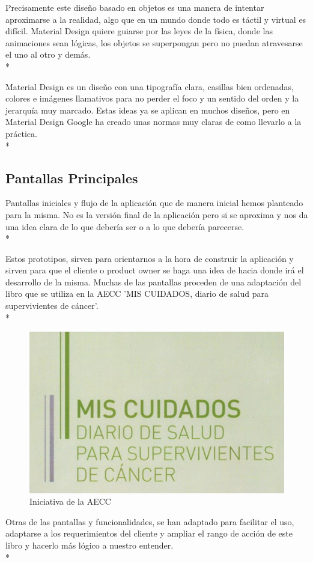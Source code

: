 \documentclass[../pfc.tex]{subfiles}
\begin{document}
		Precisamente este diseño basado en objetos es una manera de intentar aproximarse a la realidad, algo que en un mundo donde todo es táctil y virtual es difícil. Material Design quiere guiarse por las leyes de la física, donde las animaciones sean lógicas, los objetos se superpongan pero no puedan atravesarse el uno al otro y demás.\\*
		
		Material Design es un diseño con una tipografía clara, casillas bien ordenadas, colores e imágenes llamativos para no perder el foco y un sentido del orden y la jerarquía muy marcado. Estas ideas ya se aplican en muchos diseños, pero en Material Design Google ha creado unas normas muy claras de como llevarlo a la práctica.\\*
		
		\subsection{Pantallas Principales}
		
		Pantallas iniciales y flujo de la aplicación que de manera inicial hemos planteado para la misma.
		No es la versión final de la aplicación pero si se aproxima y nos da una idea clara de lo que debería ser o a lo que debería parecerse.\\*
		
		Estos prototipos, sirven para orientarnos a la hora de construir la aplicación y sirven para que el cliente o product owner se haga una idea de hacia donde irá el desarrollo de la misma. Muchas de las pantallas proceden de una adaptación del libro que se utiliza en la AECC 'MIS CUIDADOS, diario de salud para supervivientes de cáncer'.\\*
		
		\begin{figure}[H]
			\centering
			\includegraphics[width=0.4\linewidth]{../folleto/001_corto}
			\caption{Iniciativa de la AECC}
			\label{fig:001corto}
		\end{figure}
		
		Otras de las pantallas y funcionalidades, se han adaptado para facilitar el uso, adaptarse a los requerimientos del cliente y ampliar el rango de acción de este libro y hacerlo más lógico a nuestro entender.\\*
		
\end{document}
